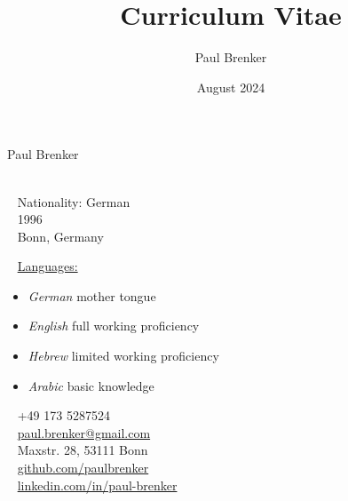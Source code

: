 \documentclass{style/modernsimplecv}
\title{Curriculum Vitae}
\author{Paul Brenker}
\date{August 2024}
\begin{document}
\thispagestyle{empty}




\begin{minipage}[t]{0.21\textwidth}
\vspace{0pt} %
\end{minipage}
\hfill
\begin{minipage}[t]{1\textwidth}
\vspace{0pt} %
\begin{shaded*}

\begin{minipage}[t]{0.47\textwidth}
\vspace{0pt} %
{\par\centering\huge{Paul Brenker}} \\[0.3cm]
\faGlobe~ Nationality: German\\
\faBirthdayCake~ 1996 \\
\faMapMarker~ Bonn, Germany \\
\begin{spacing}{0.5}
{\small
\faCommentsO~ \underline{Languages:} 

  \begin{itemize}
    \item \emph{German} mother tongue
    \item \emph{English} full working proficiency
    \item \emph{Hebrew} limited working proficiency
    \item \emph{Arabic} basic knowledge
  \end{itemize}
}
\end{spacing}
\vspace{4pt} %
\end{minipage}\hfill
\begin{minipage}[t]{0.46\textwidth}
\vspace{29pt} %
\faPhone~ +49 173 5287524 \\
\faAt~ \protect\url{paul.brenker@gmail.com} \\

\faEnvelopeO~ Maxstr. 28, 53111 Bonn \\ 

\faGithub~ \protect\url{github.com/paulbrenker} \\
\faLinkedin~ \protect\url{linkedin.com/in/paul-brenker} \\
\end{minipage}
\hfill
\end{shaded*}
\end{minipage}\\[15pt]
\end{document}
